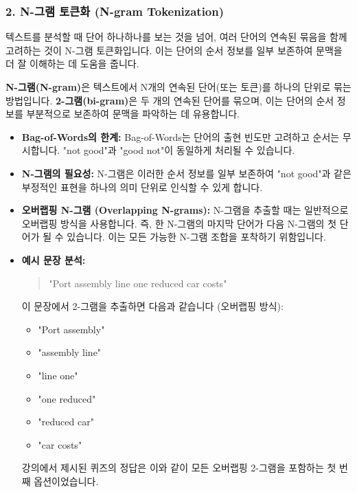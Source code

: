 \documentclass[11pt,a4paper]{article}
\theoremstyle{definition}
\begin{document}
\subsubsection{2. N-그램 토큰화 (N-gram Tokenization)}
텍스트를 분석할 때 단어 하나하나를 보는 것을 넘어, 여러 단어의 연속된 묶음을 함께 고려하는 것이 N-그램 토큰화입니다. 이는 단어의 순서 정보를 일부 보존하여 문맥을 더 잘 이해하는 데 도움을 줍니다.

\begin{tcolorbox}[summarybox, title=N-그램 토큰화의 개념]
\textbf{N-그램(N-gram)}은 텍스트에서 N개의 연속된 단어(또는 토큰)를 하나의 단위로 묶는 방법입니다.
\textbf{2-그램(bi-gram)}은 두 개의 연속된 단어를 묶으며, 이는 단어의 순서 정보를 부분적으로 보존하여 문맥을 파악하는 데 유용합니다.
\end{tcolorbox}

\begin{itemize}
    \item \textbf{Bag-of-Words의 한계:} Bag-of-Words는 단어의 출현 빈도만 고려하고 순서는 무시합니다. "not good"과 "good not"이 동일하게 처리될 수 있습니다.
    \item \textbf{N-그램의 필요성:} N-그램은 이러한 순서 정보를 일부 보존하여 "not good"과 같은 부정적인 표현을 하나의 의미 단위로 인식할 수 있게 합니다.
    \item \textbf{오버랩핑 N-그램 (Overlapping N-grams):} N-그램을 추출할 때는 일반적으로 오버랩핑 방식을 사용합니다. 즉, 한 N-그램의 마지막 단어가 다음 N-그램의 첫 단어가 될 수 있습니다. 이는 모든 가능한 N-그램 조합을 포착하기 위함입니다.
    \item \textbf{예시 문장 분석:}
    \begin{quote}
        "Port assembly line one reduced car costs"
    \end{quote}
    이 문장에서 2-그램을 추출하면 다음과 같습니다 (오버랩핑 방식):
    \begin{itemize}
        \item "Port assembly"
        \item "assembly line"
        \item "line one"
        \item "one reduced"
        \item "reduced car"
        \item "car costs"
    \end{itemize}
    강의에서 제시된 퀴즈의 정답은 이와 같이 모든 오버랩핑 2-그램을 포함하는 첫 번째 옵션이었습니다.
\end{itemize}
\end{document}
